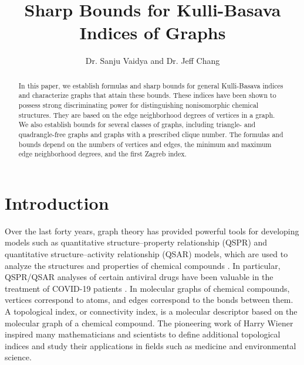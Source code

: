 \documentclass[11pt, oneside]{amsart}   	%
\title{Sharp Bounds for Kulli-Basava Indices of Graphs}
\author{Dr. Sanju Vaidya and Dr. Jeff Chang}
\theoremstyle{definition}
\theoremstyle{remark}
\numberwithin{equation}{section}
\begin{document}
\begin{abstract}

In this paper, we establish formulas and sharp bounds for general Kulli-Basava indices and characterize graphs that attain these bounds. These indices have been shown to possess strong discriminating power for distinguishing nonisomorphic chemical structures. They are based on the edge neighborhood degrees of vertices in a graph. We also establish bounds for several classes of graphs, including triangle- and quadrangle-free graphs and graphs with a prescribed clique number. The formulas and bounds depend on the numbers of vertices and edges, the minimum and maximum edge neighborhood degrees, and the first Zagreb index.

\end{abstract}
\maketitle



\section{Introduction}

Over the last forty years, graph theory has provided powerful tools for developing models such as quantitative structure--property relationship (QSPR) and quantitative structure--activity relationship (QSAR) models, which are used to analyze the structures and properties of chemical compounds \cite{devillers1999topological, basak1996estimation, todeschini2008handbook}. In particular, QSPR/QSAR analyses of certain antiviral drugs have been valuable in the treatment of COVID-19 patients \cite{kirmani2021topological, mondal2022topological}. In molecular graphs of chemical compounds, vertices correspond to atoms, and edges correspond to the bonds between them. A topological index, or connectivity index, is a molecular descriptor based on the molecular graph of a chemical compound. The pioneering work of Harry Wiener \cite{wiener1947structural} inspired many mathematicians and scientists to define additional topological indices and study their applications in fields such as medicine and environmental science.
\end{document}
